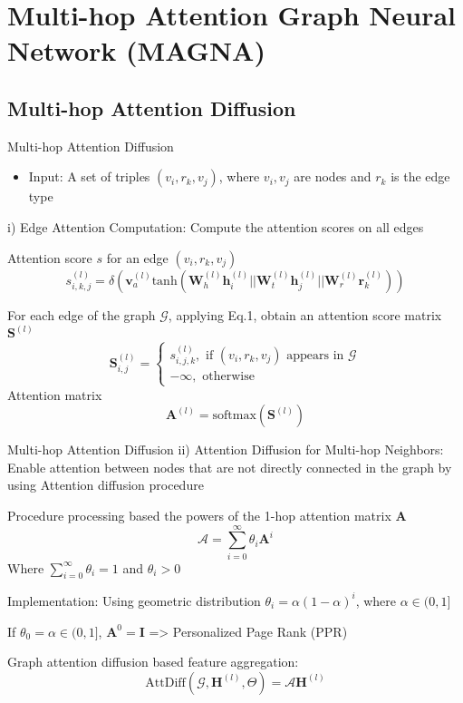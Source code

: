 \documentclass[notheorems, aspectratio=149]{beamer}
\begin{document}
		\section{Multi-hop Attention Graph Neural Network (MAGNA)}
		\subsection{Multi-hop Attention Diffusion}
		\begin{frame}{Multi-hop Attention Diffusion}
			\begin{itemize}
				\item Input: A set of triples $(v_i, r_k, v_j)$, where $v_i, v_j$ are nodes and $r_k$ is the edge type
			\end{itemize}
			i) Edge Attention Computation: Compute the attention scores on all edges
			
			Attention score $s$ for an edge $(v_i, r_k, v_j)$
			\begin{equation}
				s_{i, k, j}^{(l)} = \delta(\mathbf{v}_a^{(l)}\text{tanh}(\mathbf{W}_h^{(l)}\mathbf{h}_i^{(l)} || \mathbf{W}_t^{(l)}\mathbf{h}_j^{(l)} || \mathbf{W}_r^{(l)}\mathbf{r}_k^{(l)}))
			\end{equation}
		
			For each edge of the graph $\mathcal{G}$, applying Eq.1, obtain an attention score matrix $\mathbf{S}^{(l)}$
			\begin{equation}
				\mathbf{S}_{i, j}^{(l)} = \begin{cases}
					s_{i, j, k}^{(l)}, \text{ if } (v_i, r_k, v_j) \text{ appears in } \mathcal{G} \\
					- \infty, \text{ otherwise }
				\end{cases}
			\end{equation}
			Attention matrix
			\begin{equation}
				\mathbf{A}^{(l)} = \text{softmax}(\mathbf{S}^{(l)})
			\end{equation}
		\end{frame}
		\begin{frame}{Multi-hop Attention Diffusion}
			ii) Attention Diffusion for Multi-hop Neighbors: Enable attention between nodes that are not directly connected in the graph by using Attention diffusion procedure
			
			 Procedure processing based the powers of the 1-hop attention matrix $\mathbf{A}$
			 \begin{equation}
			 	\mathcal{A} = \sum_{i = 0}^{\infty} \theta_i \mathbf{A}^{i}
			 \end{equation}
		 Where $\sum_{i=0}^{\infty}\theta_i = 1$ and $\theta_i > 0$
		 
		 Implementation: Using geometric distribution $\theta_i = \alpha(1-\alpha)^{i}$, where $\alpha \in (0, 1]$
		 
		 If $\theta_0 = \alpha \in (0, 1]$, $\mathbf{A}^0 = \mathbf{I}$ => Personalized Page Rank (PPR)
		 
		 Graph attention
diffusion based feature aggregation:
		 \begin{equation}
		 	\text{AttDiff}(\mathcal{G}, \mathbf{H}^{(l)}, \Theta) = \mathcal{A}\mathbf{H}^{(l)}
		 \end{equation}
		\end{frame}
\end{document}
